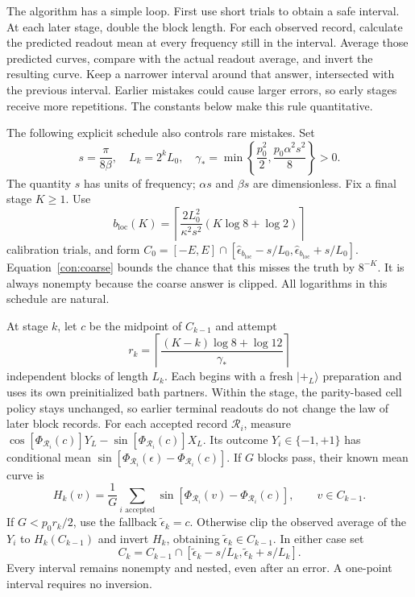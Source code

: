 \documentclass[11pt,a4paper]{article}
\numberwithin{equation}{section}
\theoremstyle{remark}
\begin{document}
The algorithm has a simple loop. First use short trials to obtain a
safe interval. At each later stage, double the block length. For each
observed record, calculate the predicted readout mean at every frequency
still in the interval. Average those predicted curves, compare with the
actual readout average, and invert the resulting curve. Keep a narrower
interval around that answer, intersected with the previous interval.
Earlier mistakes could cause larger errors, so early stages receive
more repetitions. The constants below make this rule quantitative.

The following explicit schedule also controls rare mistakes. Set
\begin{equation}
 s=\frac{\pi}{8\beta},\quad L_k=2^kL_0,\quad
 \gamma_* =\min\left\{\frac{p_0^2}{2},
                    \frac{p_0\alpha^2s^2}{8}\right\}>0.
\end{equation}
The quantity $s$ has units of frequency; $\alpha s$ and $\beta s$ are
dimensionless. Fix a final stage $K\ge1$. Use
\begin{equation}
 b_{\mathrm{loc}}(K)=\left\lceil\frac{2L_0^2}{\kappa^2s^2}
                     (K\log8+\log2)\right\rceil
\end{equation}
calibration trials, and form
$C_0=[-E,E]\cap[\widehat\epsilon_{b_{\mathrm{loc}}}-s/L_0,
\widehat\epsilon_{b_{\mathrm{loc}}}+s/L_0]$.
Equation~\eqref{con:coarse} bounds the chance that this misses the truth by
$8^{-K}$. It is always nonempty because the coarse answer is clipped.
All logarithms in this schedule are natural.

At stage $k$, let $c$ be the midpoint of $C_{k-1}$ and attempt
\begin{equation}
 r_k=\left\lceil\frac{(K-k)\log8+\log12}{\gamma_*}\right\rceil
\end{equation}
independent blocks of length $L_k$. Each begins with a fresh
$|+_L\rangle$ preparation and uses its own preinitialized bath partners.
Within the stage, the parity-based cell policy stays unchanged, so earlier
terminal readouts do not change the law of later block records.
For each accepted record $\mathcal R_i$,
measure
$\cos[\Phi_{\mathcal R_i}(c)]Y_L-
 \sin[\Phi_{\mathcal R_i}(c)]X_L$.
Its outcome $Y_i\in\{-1,+1\}$ has conditional mean
$\sin[\Phi_{\mathcal R_i}(\epsilon)-\Phi_{\mathcal R_i}(c)]$.
If $G$ blocks pass, their known mean curve is
\begin{equation}
 H_k(v)=\frac1G\sum_{i\text{ accepted}}
 \sin[\Phi_{\mathcal R_i}(v)-\Phi_{\mathcal R_i}(c)],
 \qquad v\in C_{k-1}.
 \label{con:Hk}
\end{equation}
If $G<p_0r_k/2$, use the fallback $\widetilde\epsilon_k=c$.
Otherwise clip the observed average of the $Y_i$ to $H_k(C_{k-1})$
and invert $H_k$, obtaining $\widetilde\epsilon_k\in C_{k-1}$.
In either case set
\begin{equation}
 C_k=C_{k-1}\cap
 [\widetilde\epsilon_k-s/L_k,\widetilde\epsilon_k+s/L_k].
\end{equation}
Every interval remains nonempty and nested, even after an error.
A one-point interval requires no inversion.
\end{document}
